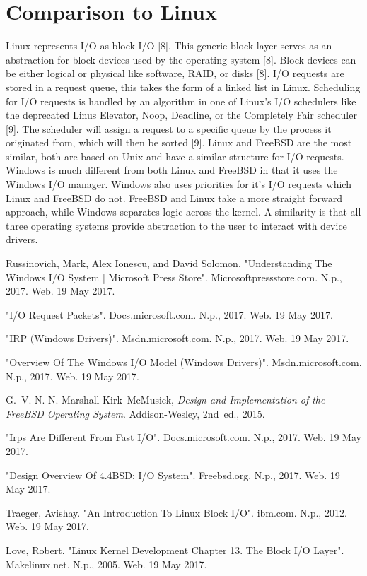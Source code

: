 \documentclass[letterpaper,10pt,titlepage,draftclsnofoot,onecolumn]{IEEEtran}
\begin{document}
\section{Comparison to Linux}
Linux represents I/O as block I/O [8]. This generic block layer serves as an abstraction for block devices used by the operating system [8]. Block devices can be either logical  or physical like software, RAID, or disks [8]. I/O requests are stored in a request queue, this takes the form of a linked list in Linux. Scheduling for I/O requests is handled by an algorithm in one of Linux's I/O schedulers like the deprecated Linus Elevator, Noop, Deadline, or the Completely Fair scheduler [9]. The scheduler will assign a request to a specific queue by the process it originated from, which will then be sorted [9]. Linux and FreeBSD are the most similar, both are based on Unix and have a similar structure for I/O requests. Windows is much different from both Linux and FreeBSD in that it uses the Windows I/O manager. Windows also uses priorities for it's I/O requests which Linux and FreeBSD do not. FreeBSD and Linux take a more straight forward approach, while Windows separates logic across the kernel. A similarity is that all three operating systems provide abstraction to the user to interact with device drivers.

\begin{thebibliography}{10}
Russinovich, Mark, Alex Ionescu, and David Solomon. "Understanding The Windows I/O System | Microsoft Press Store". Microsoftpressstore.com. N.p., 2017. Web. 19 May 2017.

 "I/O Request Packets". Docs.microsoft.com. N.p., 2017. Web. 19 May 2017.

"IRP (Windows Drivers)". Msdn.microsoft.com. N.p., 2017. Web. 19 May 2017.

"Overview Of The Windows I/O Model (Windows Drivers)". Msdn.microsoft.com. N.p., 2017. Web. 19 May 2017.

G.~V. N.-N. Marshall Kirk~McMusick, {\em Design and Implementation of the
  FreeBSD Operating System}.
\newblock Addison-Wesley, 2nd~ed., 2015.

"Irps Are Different From Fast I/O". Docs.microsoft.com. N.p., 2017. Web. 19 May 2017.

"Design Overview Of 4.4BSD: I/O System". Freebsd.org. N.p., 2017. Web. 19 May 2017.

Traeger, Avishay. "An Introduction To Linux Block I/O". ibm.com. N.p., 2012. Web. 19 May 2017.

Love, Robert. "Linux Kernel Development Chapter 13. The Block I/O Layer". Makelinux.net. N.p., 2005. Web. 19 May 2017.

 \end{thebibliography}
\end{document}

